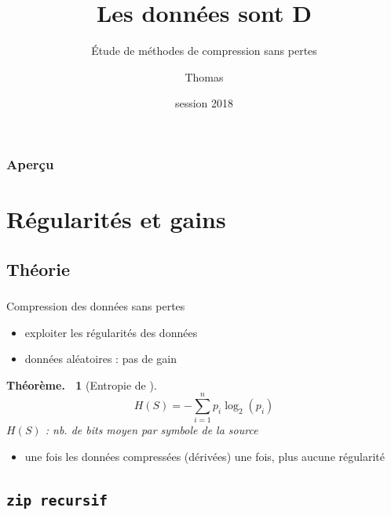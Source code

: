 \documentclass{beamer}
\title{Les données sont D\tss{1}}
\subtitle{\'Etude de méthodes de compression sans pertes}
\author{Thomas \sc{Bagrel}}
\institute{Lycée Henri \sc{Poincaré}, Nancy}
\date{\sc{tipe} session 2018}
\newcommand{\tech}[1]{\tt{#1}}
\newcommand{\relief}[1]{{\color{structureTextColor} #1}}
\theoremstyle{theoreme}
\newtheorem{theoreme}{Théorème.~}
\begin{document}


\begin{frame}
  \titlepage{}
\end{frame}

\begin{frame}
  \frametitle{Aperçu}

  \tableofcontents %
\end{frame}

\section{Régularités et gains}

\subsection{Théorie}

\begin{frame}
  \frametitle{\secname{}}
  \framesubtitle{\subsecname{}}

  \relief{Compression des données sans pertes}
  \begin{itemize}
    \item \pause exploiter les régularités des données
    \item \pause données aléatoires : pas de gain
  \end{itemize}

  \pause
  \begin{theoreme}[Entropie de ]
  \[
    H(S) = -\sum_{i = 1}^n p_i \log_2(p_i)
  \]
  {\footnotesize $H(S)$ : nb. de bits moyen par symbole de la source }
  \end{theoreme}
  \begin{itemize}
    \item \pause une fois les données compressées (dérivées) une fois, plus aucune régularité
  \end{itemize}
\end{frame}

\subsection{\tech{zip} recursif}
\end{document}
